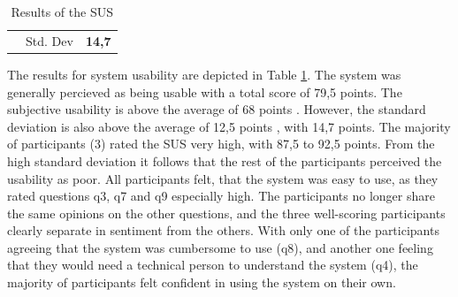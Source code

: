 \begin{table}[]
\begin{tabular}{llllllllllll}
    \rowcolor[HTML]{FFFFFF} 
                         & \multicolumn{10}{r}{\cellcolor[HTML]{FFFFFF}Std. Dev}                                                                                      & \textbf{14,7}      \\
    \end{tabular}
    \caption{Results of the SUS}
    \label{tab::sus}
    \end{table}


The results for system usability are depicted in Table \ref{tab::sus}.
The system was generally percieved as being usable with a total
score of 79,5 points. The subjective usability is above the
average of 68 points \cite{sauro2016quantifying}.
However, the standard deviation is also above the average of 
12,5 points \cite{sauro2016quantifying}, with 14,7 points.
The majority of participants (3) rated the SUS very high,
with 87,5 to 92,5 points. 
From the high standard deviation it follows that the rest of the 
participants perceived the usability as poor. 
All participants felt, that the system was easy to use,
as they rated questions q3, q7 and q9 especially high.
The participants no longer share the same opinions on the other questions, 
and the three well-scoring participants clearly separate 
in sentiment from the others.
With only one of the participants agreeing that the system
was cumbersome to use (q8), and another one feeling that they
would need a technical person to understand the system (q4),
the majority of participants felt confident in using the system on their own.

